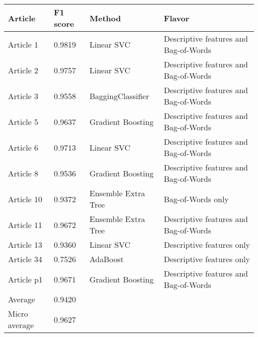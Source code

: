 \begin{tabular}{|l|l|l|l| }
\hline
Article & F1 score & Method & Flavor \\ \hline
Article 1 & 0.9819 & Linear SVC & Descriptive features and Bag-of-Words\\
Article 2 & 0.9757 & Linear SVC & Descriptive features and Bag-of-Words\\
Article 3 & 0.9558 & BaggingClassifier & Descriptive features and Bag-of-Words\\
Article 5 & 0.9637 & Gradient Boosting & Descriptive features and Bag-of-Words\\
Article 6 & 0.9713 & Linear SVC & Descriptive features and Bag-of-Words\\
Article 8 & 0.9536 & Gradient Boosting & Descriptive features and Bag-of-Words\\
Article 10 & 0.9372 & Ensemble Extra Tree & Bag-of-Words only\\
Article 11 & 0.9672 & Ensemble Extra Tree & Descriptive features and Bag-of-Words\\
Article 13 & 0.9360 & Linear SVC & Descriptive features only\\
Article 34 & 0.7526 & AdaBoost & Descriptive features only\\
Article p1 & 0.9671 & Gradient Boosting & Descriptive features and Bag-of-Words\\
Average & 0.9420 & & \\
Micro average & 0.9627 & & \\
\hline
\end{tabular}